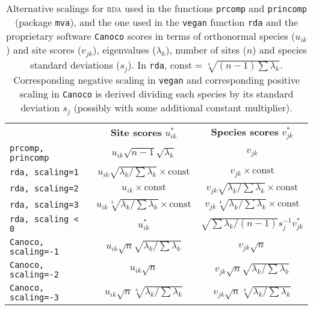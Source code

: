\documentclass[a4paper,10pt]{amsart}
\begin{document}
\begin{table}
  \caption{\label{tab:scales} Alternative scalings for \textsc{rda} used
    in the functions \texttt{prcomp} and \texttt{princomp} (package
    \texttt{mva}), and the one used in the \texttt{vegan} function \texttt{rda}
    and the proprietary software \texttt{Canoco}
    scores in terms of orthonormal species ($u_{ik}$) and site scores
    ($v_{jk}$), eigenvalues ($\lambda_k$), number of sites  ($n$) and
    species standard deviations ($s_j$). In \texttt{rda},
    $\mathrm{const} = \sqrt[4]{(n-1) \sum \lambda_k}$.  Corresponding
    negative scaling in \texttt{vegan}
    and corresponding positive scaling in \texttt{Canoco} is derived
    dividing each  species by its standard deviation $s_j$ (possibly
    with some additional constant multiplier).  }
\begin{tabular}{lcc}
& \textbf{Site scores} $u_{ik}^*$ &
\textbf{Species scores} $v_{jk}^*$ \\
\texttt{prcomp, princomp} &
$u_{ik} \sqrt{n-1} \sqrt{\lambda_k}$ &
$v_{jk}$ \\
\texttt{rda, scaling=1} &
$u_{ik} \sqrt{\lambda_k/ \sum \lambda_k} \times \mathrm{const}$ &
$v_{jk} \times \mathrm{const}$
\\
\texttt{rda, scaling=2} &
$u_{ik} \times \mathrm{const}$ &
$v_{jk} \sqrt{\lambda_k/ \sum \lambda_k} \times \mathrm{const}$  \\
\texttt{rda, scaling=3} &
$u_{ik} \sqrt[4]{\lambda_k/ \sum \lambda_k} \times \mathrm{const}$ &
$v_{jk} \sqrt[4]{\lambda_k/ \sum \lambda_k} \times \mathrm{const}$ \\
\texttt{rda, scaling < 0} &
$u_{ik}^*$ &
$\sqrt{\sum \lambda_k /(n-1)} s_j^{-1} v_{jk}^*$
\\
\texttt{Canoco, scaling=-1} &
$u_{ik} \sqrt{n} \sqrt{\lambda_k / \sum \lambda_k}$ &
$v_{jk} \sqrt{n}$ \\
\texttt{Canoco, scaling=-2} &
$u_{ik} \sqrt{n}$ &
$v_{jk} \sqrt{n} \sqrt{\lambda_k / \sum \lambda_k}$
\\
\texttt{Canoco, scaling=-3} &
$u_{ik} \sqrt{n} \sqrt[4]{\lambda_k / \sum \lambda_k}$ &
$v_{jk} \sqrt{n} \sqrt[4]{\lambda_k / \sum \lambda_k}$
\end{tabular}
\end{table}
\end{document}
